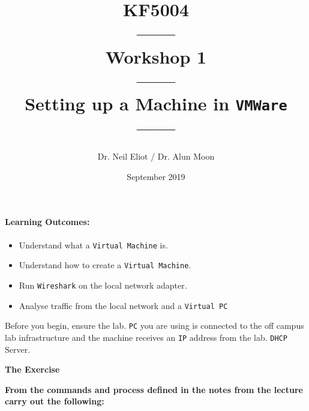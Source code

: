 \documentclass[11pt]{article}
\begin{document}
\author{Dr. Neil Eliot / Dr. Alun Moon}
\title{KF5004\\------\\Workshop 1\\------\\Setting up a Machine in \texttt{VMWare}\\------}
\date{September 2019}
\maketitle

\newpage



\paragraph{Learning Outcomes:}
\begin{itemize}
\item Understand what a \texttt{Virtual Machine} is.
\item Understand how to create a \texttt{Virtual Machine}.
\item Run \texttt{Wireshark} on the local network adapter.
\item Analyse traffic from the local network and a \texttt{Virtual PC}
\end{itemize}


\begin{tcolorbox}[title={\textbf{Important:}}]
    Before you begin, ensure the lab. \texttt{PC} you are using is connected to the off campus lab infrastructure and the machine receives an \texttt{IP} address from the lab. \texttt{DHCP} Server.
\end{tcolorbox}
\newpage

\noindent\textbf{The Exercise}\\
\begin{tcolorbox}[colback=blue!20]
    \noindent\textbf{From the commands and process defined in the notes from the lecture carry out the following:}
\end{tcolorbox}
\end{document}
